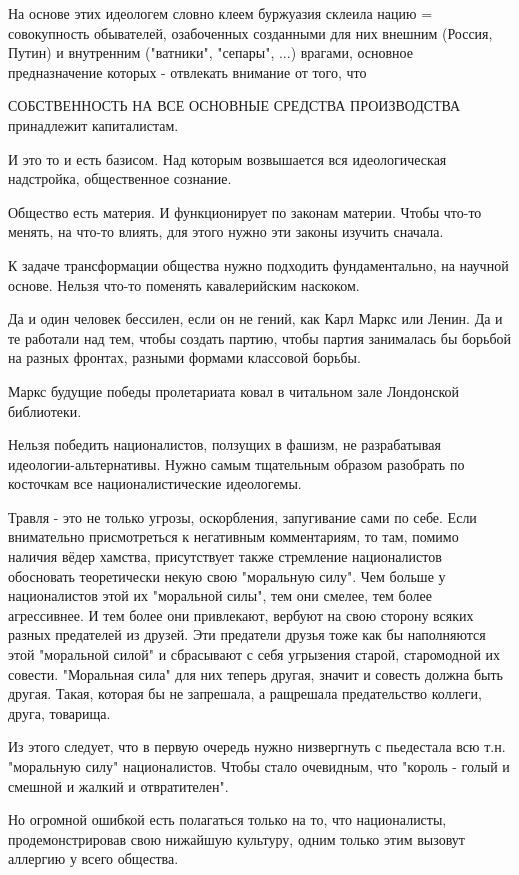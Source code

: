 \documentclass[a4paper,11pt]{extreport}
\begin{document}
\begin{itemize}
На основе этих идеологем словно клеем буржуазия склеила нацию = совокупность обывателей, озабоченных созданными для них внешним (Россия, Путин) и внутренним ("ватники", "сепары", ...) врагами, основное предназначение которых - отвлекать внимание от того, что

СОБСТВЕННОСТЬ НА ВСЕ ОСНОВНЫЕ СРЕДСТВА ПРОИЗВОДСТВА принадлежит капиталистам.

И это то и есть базисом. Над которым возвышается вся идеологическая надстройка, общественное сознание.

Общество есть материя. И функционирует по законам материи. Чтобы что-то менять, на что-то влиять, для этого нужно эти законы изучить сначала.

К задаче трансформации общества нужно подходить фундаментально, на научной основе.
Нельзя что-то поменять кавалерийским наскоком.

Да и один человек бессилен, если он не гений, как Карл Маркс или Ленин. Да и те работали над тем, чтобы создать партию, чтобы партия занималась бы борьбой на разных фронтах, разными формами классовой борьбы.

Маркс будущие победы пролетариата ковал в читальном зале Лондонской библиотеки.

Нельзя победить националистов, ползущих в фашизм, не разрабатывая идеологии-альтернативы. Нужно самым тщательным образом разобрать по косточкам все националистические идеологемы.

Травля - это не только угрозы, оскорбления, запугивание сами по себе. Если внимательно присмотреться к негативным комментариям, то там, помимо наличия вёдер хамства, присутствует также стремление националистов обосновать теоретически некую свою "моральную силу".
Чем больше у националистов этой их "моральной силы", тем они смелее, тем более агрессивнее.
И тем более они привлекают, вербуют на свою сторону всяких разных предателей из друзей.
Эти предатели друзья тоже как бы наполняются этой "моральной силой" и сбрасывают с себя угрызения старой, старомодной их совести. "Моральная сила" для них теперь другая, значит и совесть должна быть другая. Такая, которая бы не запрешала, а ращрешала предательство коллеги, друга, товарища.

Из этого следует, что в первую очередь нужно низвергнуть с пьедестала всю т.н. "моральную силу" националистов. Чтобы стало очевидным, что "король - голый и смешной и жалкий и отвратителен".

Но огромной ошибкой есть полагаться только на то, что националисты, продемонстрировав свою нижайшую культуру, одним только этим вызовут аллергию у всего общества.


\end{itemize}
\end{document}
